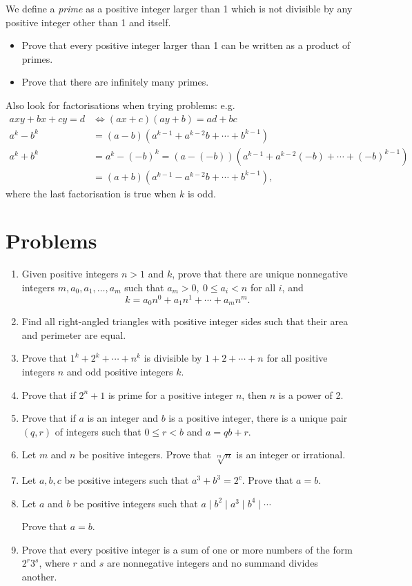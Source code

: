 \documentclass{article}
\begin{document}
We define a \emph{prime} as a positive integer larger than 1 which is not
divisible by any positive integer other than 1 and itself.
\begin{itemize}
	\item Prove that every positive integer larger than 1 can be written as a
	      product of primes.
	\item Prove that there are infinitely many primes.
\end{itemize}
Also look for factorisations when trying problems: e.g.
\begin{align*}
	axy+bx+cy=d & \iff (ax+c)(ay+b)=ad+bc                                     \\
	a^k-b^k     & =(a-b)\left(a^{k-1}+a^{k-2}b+\cdots+b^{k-1}\right)          \\
	a^k+b^k     & =a^k-(-b)^k=(a-(-b))(a^{k-1}+a^{k-2}(-b)+\cdots+(-b)^{k-1}) \\
	            & =(a+b)(a^{k-1}-a^{k-2}b+\cdots+b^{k-1}),
\end{align*}
where the last factorisation is true when $k$ is odd.
\section{Problems}
\begin{enumerate}
	\item Given positive integers $n>1$ and $k$, prove that there are unique
	      nonnegative integers $m,a_0,a_1,\ldots,a_m$ such that $a_m>0,\ 0\le
		      a_i<n$ for all $i$, and
	      \[k=a_0 n^0+a_1 n^1+\cdots+a_m n^m.\]
	\item Find all right-angled triangles with positive integer sides
	      such that their area and perimeter are equal.
	\item Prove that $1^k+2^k+\cdots+n^k$ is divisible by $1+2+\cdots+n$ for
	      all positive integers $n$ and odd positive integers $k$.
	\item Prove that if $2^n+1$ is prime for a positive integer $n$, then $n$ is
	      a power of 2.
	\item Prove that if $a$ is an integer and $b$ is a positive integer, there
	      is a unique pair $(q,r)$ of integers such that $0\le r<b$ and $a=qb+r$.
	\item Let $m$ and $n$ be positive integers. Prove that $\sqrt[m]n$ is an
	      integer or irrational.
	\item Let $a,b,c$ be positive integers such that $a^3+b^3=2^c$. Prove that
	      $a=b$.
	\item Let $a$ and $b$ be positive integers such that $a\mid b^2\mid a^3\mid
		      b^4\mid\cdots$

	      Prove that $a=b$.
	\item Prove that every positive integer is a sum of one or more numbers of
	      the form $2^r3^s$, where $r$ and $s$ are nonnegative integers and no
	      summand divides another.
\end{enumerate}
\newpage
\end{document}
